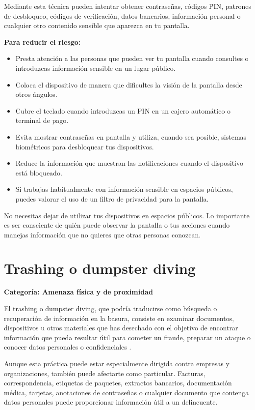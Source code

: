\documentclass[
  spanish,
  a4paper,
  openany]{book}
\begin{document}
Mediante esta técnica pueden intentar obtener contraseñas, códigos PIN, patrones de desbloqueo, códigos de verificación, datos bancarios, información personal o cualquier otro contenido sensible que aparezca en tu pantalla.

\textbf{Para reducir el riesgo:}

\begin{itemize}
\item
  Presta atención a las personas que pueden ver tu pantalla cuando consultes o introduzcas información sensible en un lugar público.
\item
  Coloca el dispositivo de manera que dificultes la visión de la pantalla desde otros ángulos.
\item
  Cubre el teclado cuando introduzcas un PIN en un cajero automático o terminal de pago.
\item
  Evita mostrar contraseñas en pantalla y utiliza, cuando sea posible, sistemas biométricos para desbloquear tus dispositivos.
\item
  Reduce la información que muestran las notificaciones cuando el dispositivo está bloqueado.
\item
  Si trabajas habitualmente con información sensible en espacios públicos, puedes valorar el uso de un filtro de privacidad para la pantalla.
\end{itemize}

No necesitas dejar de utilizar tus dispositivos en espacios públicos. Lo importante es ser consciente de quién puede observar la pantalla o tus acciones cuando manejas información que no quieres que otras personas conozcan.

\section{Trashing o dumpster diving}\label{trashing-o-dumpster-diving}

\textbf{Categoría: Amenaza física y de proximidad}

El trashing o dumpster diving, que podría traducirse como búsqueda o recuperación de información en la basura, consiste en examinar documentos, dispositivos u otros materiales que has desechado con el objetivo de encontrar información que pueda resultar útil para cometer un fraude, preparar un ataque o conocer datos personales o confidenciales \citep{INCIBE-dumpster-diving}.

Aunque esta práctica puede estar especialmente dirigida contra empresas y organizaciones, también puede afectarte como particular. Facturas, correspondencia, etiquetas de paquetes, extractos bancarios, documentación médica, tarjetas, anotaciones de contraseñas o cualquier documento que contenga datos personales puede proporcionar información útil a un delincuente.
\end{document}
